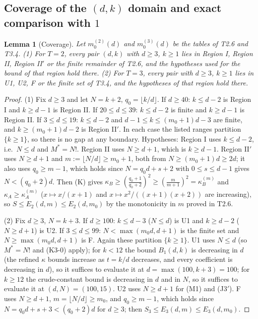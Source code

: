 \documentclass[11pt]{article}
\newtheorem{lemma}[theorem]{Lemma}
\theoremstyle{definition}
\theoremstyle{remark}
\begin{document}
\subsection{Coverage of the \texorpdfstring{$(d,k)$}{(d,k)} domain and exact comparison with \texorpdfstring{$1$}{1}}\label{app:coverage}
\begin{lemma}[Coverage]\label{lem:cover}
Let $m_0^{(2)}(d)$ and $m_0^{(3)}(d)$ be the tables of T2.6 and T3.4. (1) For $T=2$, every pair $(d,k)$ with $d\ge3$, $k\ge1$ lies in Region I,
Region II, Region II$'$ or the finite remainder of T2.6, and the hypotheses used for the bound of that region hold there. (2) For $T=3$, every pair
with $d\ge3$, $k\ge1$ lies in U1, U2, F or the finite set of T3.4, and the hypotheses of that region hold there.
\end{lemma}
\begin{proof}
(1) Fix $d\ge3$ and let $N=k+2$, $q_0=\lfloor k/d\rfloor$. If $d\ge40$: $k\le d-2$ is Region I and $k\ge d-1$ is Region II. If $20\le d\le39$: $k\le d-2$
is finite and $k\ge d-1$ is Region II. If $3\le d\le19$: $k\le d-2$ and $d-1\le k\le(m_0+1)d-3$ are finite, and $k\ge(m_0+1)d-2$ is Region II$'$.
In each case the listed ranges partition $\{k\ge1\}$, so there is no gap at any boundary. Hypotheses: Region I uses $k\le d-2$, i.e.\ $N\le d$ and
$M^\ast=N!$. Region II uses $N\ge d+1$, which is $k\ge d-1$. Region II$'$ uses $N\ge d+1$ and $m:=\lfloor N/d\rfloor\ge m_0+1$, both from
$N\ge(m_0+1)d\ge2d$; it also uses $q_0\ge m-1$, which holds since $N=q_0d+s+2$ with $0\le s\le d-1$ gives $N<(q_0+2)d$. Then (K) gives
$\kappa_B\ge(\frac{q_0+1}{q_0+2})^2\ge(\frac m{m+1})^2=\kappa_B^{(m)}$ and $\kappa_A\ge\kappa_A^{(m)}$ ($x\mapsto x/(x+1)$ and $x\mapsto x^2/((x+1)(x+2))$
are increasing), so $S\le E_2(d,m)\le E_2(d,m_0)$ by the monotonicity in $m$ proved in T2.6.

(2) Fix $d\ge3$, $N=k+3$. If $d\ge100$: $k\le d-3$ ($N\le d$) is U1 and $k\ge d-2$ ($N\ge d+1$) is U2. If $3\le d\le99$: $N<\max(m_0d,d+1)$ is the finite
set and $N\ge\max(m_0d,d+1)$ is F. Again these partition $\{k\ge1\}$. U1 uses $N\le d$ (so $M^\ast=N!$ and (K3-0) apply); for $k<12$ the bound
$B_1(d,k)$ is decreasing in $d$ (the refined $\kappa$ bounds increase as $t=k/d$ decreases, and every coefficient is decreasing in $d$), so it
suffices to evaluate it at $d=\max(100,k+3)=100$; for $k\ge12$ the crude-constant bound is decreasing in $d$ and in $N$, so it suffices to evaluate it
at $(d,N)=(100,15)$. U2 uses $N\ge d+1$ for (M1) and (J3$'$). F uses $N\ge d+1$, $m=\lfloor N/d\rfloor\ge m_0$, and $q_0\ge m-1$, which holds since
$N=q_0d+s+3<(q_0+2)d$ for $d\ge3$; then $S_3\le E_3(d,m)\le E_3(d,m_0)$.
\end{proof}
\end{document}
